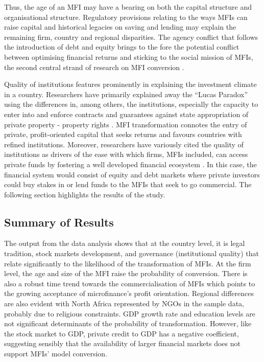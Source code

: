 \documentclass[a4paper, nobind]{templates/ociamthesis}
\begin{document}
Thus, the age of an MFI may have a bearing on both the capital structure and organisational structure. Regulatory provisions relating to the ways MFIs can raise capital and historical legacies on saving and lending \autocite{bayai2016financing} may explain the remaining firm, country and regional disparities. The agency conflict that follows the introduction of debt and equity brings to the fore the potential conflict between optimising financial returns and sticking to the social mission of MFIs, the second central strand of research on MFI conversion \autocite{nurmakhanova2015trade,bayai2016financing,abdulai2017trade,awaworyi2018sustainability}.

Quality of institutions features prominently in explaining the investment climate in a country. Researchers have primarily explained away the ``Lucas Paradox'' using the differences in, among others, the institutions, especially the capacity to enter into and enforce contracts and guarantees against state appropriation of private property - property rights \autocite{azemar2013has,goktan2015explanation}. MFI transformation connotes the entry of private, profit-oriented capital that seeks returns and favours countries with refined institutions. Moreover, researchers have variously cited the quality of institutions as drivers of the ease with which firms, MFIs included, can access private funds by fostering a well developed financial ecosystem \autocite{huang2010political,kaidi2019financial}. In this case, the financial system would consist of equity and debt markets where private investors could buy stakes in or lend funds to the MFIs that seek to go commercial. The following section highlights the results of the study.

\hypertarget{summary-of-results}{%
\subsection{Summary of Results}\label{summary-of-results}}

The output from the data analysis shows that at the country level, it is legal tradition, stock markets development, and governance (institutional quality) that relate significantly to the likelihood of the transformation of MFIs. At the firm level, the age and size of the MFI raise the probability of conversion. There is also a robust time trend towards the commercialisation of MFIs which points to the growing acceptance of microfinance's profit orientation. Regional differences are also evident with North Africa represented by NGOs in the sample data, probably due to religious constraints. GDP growth rate and education levels are not significant determinants of the probability of transformation. However, like the stock market to GDP, private credit to GDP has a negative coefficient, suggesting sensibly that the availability of larger financial markets does not support MFIs' model conversion.
\end{document}
